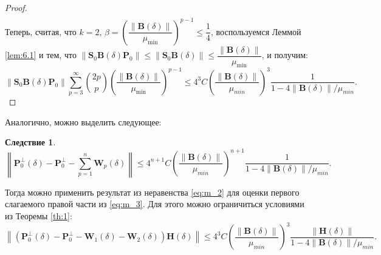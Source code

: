 \documentclass[specialist,
substylefile = spbu_report.rtx,
subf,href,colorlinks=true, 12pt]{disser}
\newcommand\norm[1]{\left\|#1\right\|}
\newtheorem{corollary}{Следствие}
\begin{document}
\begin{proof}
\begin{align*}
		\end{align*}
		Теперь, считая, что $k=2,\,\beta = \left(\dfrac{\norm{\mathbf{B}(\delta)}}{\mu_{\min}}\right)^{p-1} \leqslant\dfrac{1}{4}$, воспользуемся Леммой \ref{lem:6.1} и тем, что $\norm{\mathbf{S}_0\mathbf{B}(\delta)\mathbf{P}_0}\leqslant\norm{\mathbf{S}_0\mathbf{B}(\delta)}\leqslant\dfrac{\norm{\mathbf{B}(\delta)}}{\mu_{\min}}$, и получим:
		\begin{equation*}
			\norm{\mathbf{S}_0\mathbf{B}(\delta)\mathbf{P}_0}\sum_{p=3}^\infty{2p\choose p}\left(\dfrac{\norm{\mathbf{B}(\delta)}}{\mu_{\min}}\right)^{p-1}\leqslant4^3C\left(\dfrac{\norm{\mathbf{B}(\delta)}}{\mu_{min}}\right)^3\dfrac{1}{1-4\norm{\mathbf{B}(\delta)}/\mu_{min}}.
		\end{equation*}
	\end{proof}
	Аналогично, можно выделить следующее:
	\begin{corollary}
		\begin{equation}\label{eq:m_2}
			\norm{\mathbf{P}_0^\bot(\delta) - \mathbf{P}_0^\bot - \sum\limits^n_{p=1}\mathbf{W}_p(\delta)} \leqslant 4^{n+1}C\left(\dfrac{\norm{\mathbf{B}(\delta)}}{\mu_{min}}\right)^{n+1}\dfrac{1}{1-4\norm{\mathbf{B}(\delta)}/\mu_{min}}.
		\end{equation}
	\end{corollary}
	Тогда можно применить результат из неравенства \eqref{eq:m_2} для оценки первого слагаемого правой части из \eqref{eq:m_3}. Для этого можно ограничиться условиями из Теоремы \ref{th:1}:
	\begin{equation}
		\label{eq:noneq_2}
		\norm{\left(\mathbf{P}_0^\bot(\delta) - \mathbf{P}_0^\bot - \mathbf{W}_1(\delta) - \mathbf{W}_2(\delta)\right)\mathbf{H}(\delta)} \leqslant 4^3C\left(\dfrac{\norm{\mathbf{B}(\delta)}}{\mu_{min}}\right)^3\dfrac{\norm{\mathbf{H}(\delta)}}{1-4\norm{\mathbf{B}(\delta)}/\mu_{min}}.
	\end{equation}
\end{document}
